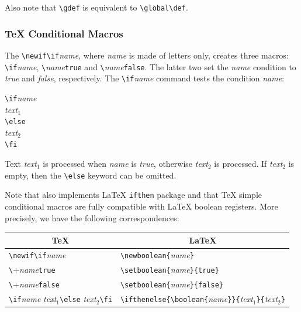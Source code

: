 Also note that \verb+\gdef+ is equivalent to \verb+\global\def+.


\subsubsection{\TeX{} Conditional Macros}\label{texcond}
The \verb+\newif\if+\textit{name}, where \textit{name} is made of letters
only, creates three macros:
\verb+\if+\textit{name}, \verb+\+\textit{name}\verb+true+ and
\verb+\+\textit{name}\verb+false+.
The latter two set the \textit{name} condition to \textit{true} and
\textit{false}, respectively.
The \verb+\if+\textit{name} command tests the condition \textit{name}:
\begin{flushleft}
\verb+\if+\textit{name}\\
\textit{text$_1$}\\
\verb+\else+\\
\textit{text$_2$}\\
\verb+\fi+\\
\end{flushleft}
Text \textit{text$_1$} is processed when \textit{name} is
\textit{true}, otherwise \textit{text$_2$} is processed.
If \textit{text$_2$}  is empty, then the \verb+\else+ keyword can be
omitted.

Note that \hevea{} also implements \LaTeX{} \texttt{ifthen} package
and that \TeX{} simple conditional macros are fully compatible with
\LaTeX{} boolean registers. More precisely,
we have the following correspondences:
\begin{center}
\begin{tabular}{p{.3\linewidth}@{\quad}p{.4\linewidth}}
\multicolumn{1}{c}{\TeX} & \multicolumn{1}{c}{\LaTeX}\\[.5em]
\hline
\verb+\newif\if+\textit{name} & \verb+\newboolean{+\textit{name}\verb+}+\\[.5em]
\verb+\+\textit{name}\verb+true+ &
\verb+\setboolean{+\textit{name}\verb+}{true}+\\[.5em]
\verb+\+\textit{name}\verb+false+ &
\verb+\setboolean{+\textit{name}\verb+}{false}+\\[.5em]
\verb+\if+\textit{name} \textit{text$_1$}\verb+\else+
\textit{text$_2$}\verb+\fi+ &
\verb+\ifthenelse{\boolean{+\textit{name}\verb+}}{+\textit{text$_1$}\verb+}{+\textit{text$_2$}\verb+}+\\[.5em]
\end{tabular}
\end{center}

